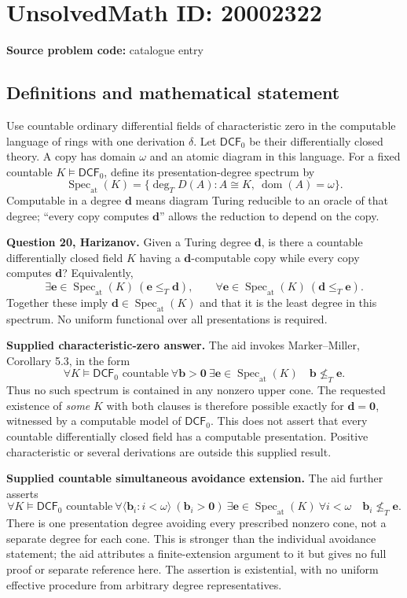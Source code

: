 \documentclass[11pt]{article}
\begin{document}
\section*{UnsolvedMath ID: 20002322}
\textbf{Source problem code:} catalogue entry
\subsection{Definitions and mathematical statement}
Use countable ordinary differential fields of characteristic zero in the computable language of rings with one derivation $\delta$. Let $\mathsf{DCF}_0$ be their differentially closed theory. A copy has domain $\omega$ and an atomic diagram in this language. For a fixed countable $K\models\mathsf{DCF}_0$, define its presentation-degree spectrum by
\[
 \operatorname{Spec}_{\mathrm{at}}(K)
   =\{\deg_TD(A):A\cong K,\ \operatorname{dom}(A)=\omega\}.
\]
Computable in a degree $\mathbf d$ means diagram Turing reducible to an oracle of that degree; ``every copy computes $\mathbf d$'' allows the reduction to depend on the copy.

\textbf{Question 20, Harizanov.} Given a Turing degree $\mathbf d$, is there a countable differentially closed field $K$ having a $\mathbf d$-computable copy while every copy computes $\mathbf d$? Equivalently,
\[
 \exists\mathbf e\in\operatorname{Spec}_{\mathrm{at}}(K)\ (\mathbf e\le_T\mathbf d),
 \qquad\forall\mathbf e\in\operatorname{Spec}_{\mathrm{at}}(K)\ (\mathbf d\le_T\mathbf e).
\]
Together these imply $\mathbf d\in\operatorname{Spec}_{\mathrm{at}}(K)$ and that it is the least degree in this spectrum. No uniform functional over all presentations is required.

\textbf{Supplied characteristic-zero answer.} The aid invokes Marker--Miller, Corollary 5.3, in the form
\[
 \forall K\models\mathsf{DCF}_0\text{ countable}\ \forall\mathbf b>\mathbf0\
 \exists\mathbf e\in\operatorname{Spec}_{\mathrm{at}}(K)
                         \quad\mathbf b\not\le_T\mathbf e.
\]
Thus no such spectrum is contained in any nonzero upper cone. The requested existence of \emph{some} $K$ with both clauses is therefore possible exactly for $\mathbf d=\mathbf0$, witnessed by a computable model of $\mathsf{DCF}_0$. This does not assert that every countable differentially closed field has a computable presentation. Positive characteristic or several derivations are outside this supplied result.

\textbf{Supplied countable simultaneous avoidance extension.} The aid further asserts
\[
 \forall K\models\mathsf{DCF}_0\text{ countable}\
 \forall\langle\mathbf b_i:i<\omega\rangle\ (\mathbf b_i>\mathbf0)\
 \exists\mathbf e\in\operatorname{Spec}_{\mathrm{at}}(K)\
 \forall i<\omega\quad\mathbf b_i\not\le_T\mathbf e.
\]
There is one presentation degree avoiding every prescribed nonzero cone, not a separate degree for each cone. This is stronger than the individual avoidance statement; the aid attributes a finite-extension argument to it but gives no full proof or separate reference here. The assertion is existential, with no uniform effective procedure from arbitrary degree representatives.
\end{document}
